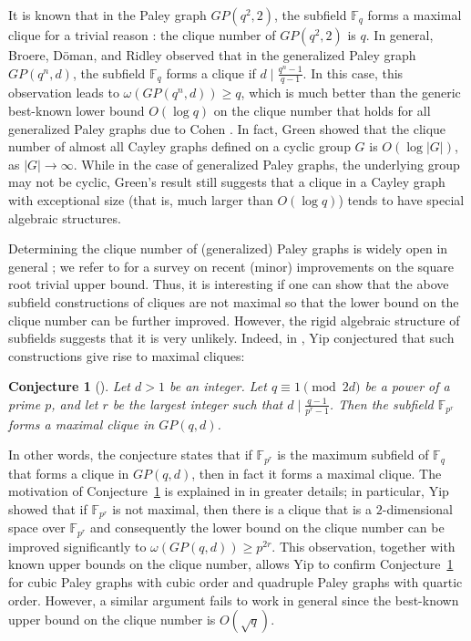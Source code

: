 \documentclass[12pt,reqno]{amsart}
\newtheorem{conj}[thm]{Conjecture}
\newcommand{\F}{\mathbb{F}}
\begin{document}
It is known that in the Paley graph $GP(q^2,2)$, the subfield $\F_q$ forms a maximal clique for a trivial reason \cite{BDR}: the clique number of $GP(q^2,2)$ is $q$. In general, Broere,  Döman, and Ridley \cite{BDR} observed that in the generalized Paley graph $GP(q^n,d)$, the subfield $\F_q$ forms a clique if $d \mid \frac{q^n-1}{q-1}$. In this case, this observation leads to  $\omega(GP(q^n,d)) \geq q$, which is much better than the generic best-known lower bound $O(\log q)$ on the clique number that holds for all generalized Paley graphs due to Cohen \cite{SC}. In fact, 
Green \cite{Green} showed that the clique number of almost all Cayley graphs defined on a cyclic group $G$ is $O(\log |G|)$, as $|G| \to \infty$. While in the case of generalized Paley graphs, the underlying group may not be cyclic, Green's result still suggests that a clique in a Cayley graph with exceptional size (that is, much larger than $O(\log q)$) tends to have special algebraic structures. 

Determining the clique number of (generalized) Paley graphs is widely open in general \cite{CL}; we refer to \cite[Section 1.3] {YipG} for a survey on recent (minor) improvements on the square root trivial upper bound. Thus, it is interesting if one can show that the above subfield constructions of cliques are not maximal so that the lower bound on the clique number can be further improved. However, the rigid algebraic structure of subfields suggests that it is very unlikely. Indeed, in \cite[Conjecture 1.4]{Y22}, Yip conjectured that such constructions give rise to maximal cliques:

\begin{conj}[{\cite[Conjecture 1.4]{Y22}}]\label{maxconj}
Let $d>1$ be an integer. Let $q \equiv 1 \pmod {2d}$ be a power of a prime $p$, and let $r$ be the largest integer such that $d \mid \frac{q-1}{p^r-1}$. Then the subfield $\F_{p^r}$ forms a maximal clique in $GP(q,d)$.
\end{conj}

In other words, the conjecture states that if $\F_{p^r}$ is the maximum subfield of $\F_q$ that forms a clique in $GP(q,d)$, then in fact it forms a maximal clique. The motivation of Conjecture~\ref{maxconj} is explained in \cite{Y22} in greater details; in particular, Yip \cite[Section 3]{Y22} showed that if $\F_{p^r}$ is not maximal, then there is a clique that is a $2$-dimensional space over $\F_{p^r}$ and consequently the lower bound on the clique number can be improved significantly to $\omega(GP(q,d)) \geq p^{2r}$. This observation, together with known upper bounds on the clique number, allows Yip \cite[Theorem 1.5 and Theorem 1.6]{Y22} to confirm Conjecture~\ref{maxconj} for cubic Paley graphs with cubic order and quadruple Paley graphs with quartic order. However, a similar argument fails to work in general since the best-known upper bound on the clique number is $O(\sqrt{q})$.
\end{document}
